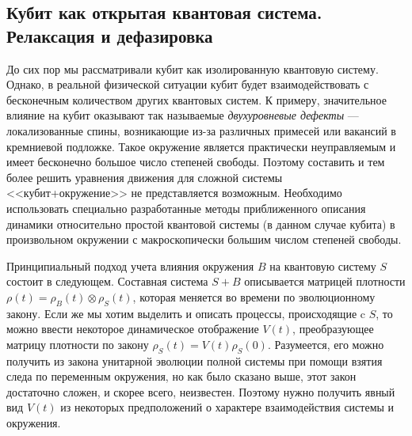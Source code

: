 \subsection{Кубит как открытая квантовая система. Релаксация и дефазировка}
\label{sec:Lind}
До сих пор мы рассматривали кубит как изолированную квантовую систему. Однако, в реальной физической ситуации кубит будет взаимодействовать с бесконечным количеством других квантовых систем. К примеру, значительное влияние на кубит оказывают так называемые \textit{двухуровневые дефекты} --- локализованные спины, возникающие из-за различных примесей или вакансий в кремниевой подложке. Такое окружение является практически неуправляемым и имеет бесконечно большое число степеней свободы. Поэтому составить и тем более решить уравнения движения для сложной системы <<кубит+окружение>> не представляется возможным. Необходимо использовать специально разработанные методы приближенного описания динамики относительно простой квантовой системы (в данном случае кубита) в произвольном окружении с макроскопически большим числом степеней свободы.

Принципиальный подход учета влияния окружения $B$ на квантовую систему $S$ состоит в следующем. Составная система $S+B$ описывается матрицей плотности $\rho(t)=\rho_B(t)\otimes\rho_S(t)$, которая меняется во времени по эволюционному закону. Если же мы хотим выделить и описать процессы, происходящие c $S$, то можно ввести некоторое динамическое отображение $V(t)$, преобразующее матрицу плотности по закону $\rho_S(t) = V(t)\rho_S(0)$. Разумеется, его можно получить из закона унитарной эволюции полной системы при помощи взятия следа по переменным окружения, но как было сказано выше, этот закон достаточно сложен, и скорее всего, неизвестен. Поэтому нужно получить явный вид $V(t)$ из некоторых предположений о характере взаимодействия системы и окружения.

